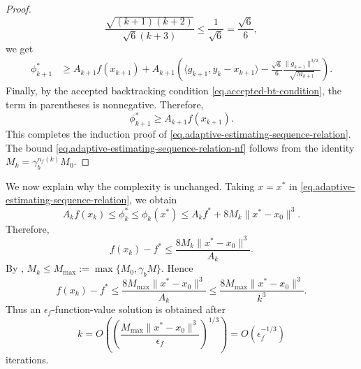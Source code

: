 \begin{itemize}
{\begin{proof}
\[                      \frac{\sqrt{(k+1)(k+2)}}{\sqrt 6(k+3)}
                      \le
                      \frac{1}{\sqrt 6}
                      =
                      \frac{\sqrt 6}{6},
                  \]
                  we get
                  \begin{align*}
                      \phi_{k+1}^*
                       & \ge
                      A_{k+1}f(x_{k+1})
                      +
                      A_{k+1}
                      \left(
                      \langle g_{k+1},y_k-x_{k+1}\rangle
                      -
                      \frac{\sqrt 6}{6}
                      \frac{\|g_{k+1}\|^{3/2}}{\sqrt{M_{k+1}}}
                      \right).
                  \end{align*}
                  Finally, by the accepted backtracking condition \eqref{eq.accepted-bt-condition}, the term in parentheses is nonnegative. Therefore,
                  \[
                      \phi_{k+1}^*
                      \ge
                      A_{k+1}f(x_{k+1}).
                  \]
                  This completes the induction proof of \eqref{eq.adaptive-estimating-sequence-relation}. The bound \eqref{eq.adaptive-estimating-sequence-relation-nf} follows from the identity \(M_k=\gamma_b^{n_f(k)}M_0\).
              \end{proof}

              We now explain why the complexity is unchanged. Taking \(x=x^*\) in \eqref{eq.adaptive-estimating-sequence-relation}, we obtain
              \[
                  A_k f(x_k)
                  \le
                  \phi_k^*
                  \le
                  \phi_k(x^*)
                  \le
                  A_k f^*
                  +
                  8M_k\|x^*-x_0\|^3.
              \]
              Therefore,
              \[
                  f(x_k)-f^*
                  \le
                  \frac{8M_k\|x^*-x_0\|^3}{A_k}.
              \]
              By , \(M_k\le M_{\max}:=\max\{M_0,\gamma_b M\}\). Hence
              \[
                  f(x_k)-f^*
                  \le
                  \frac{8M_{\max}\|x^*-x_0\|^3}{A_k}\leq \frac{8M_{\max}\|x^*-x_0\|^3}{k^3}.
              \]
              Thus an \(\epsilon_f\)-function-value solution is obtained after
              \[
                  k
                  =
                  O\left(
                  \left(
                      \frac{M_{\max}\|x^*-x_0\|^3}{\epsilon_f}
                      \right)^{1/3}
                  \right)
                  =
                  O(\epsilon_f^{-1/3})
              \]
              iterations.
          }
\end{itemize}

